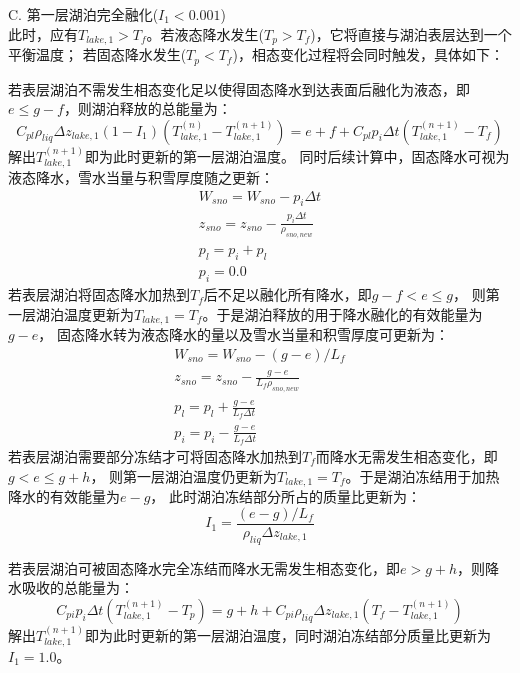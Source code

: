 C. 	第一层湖泊完全融化($I_1<0.001$)\\
此时，应有$T_{lake,1}>T_f$。若液态降水发生($T_p>T_f$)，它将直接与湖泊表层达到一个平衡温度；
若固态降水发生($T_p<T_f$)，相态变化过程将会同时触发，具体如下：

若表层湖泊不需发生相态变化足以使得固态降水到达表面后融化为液态，即$e\le g-f$，则湖泊释放的总能量为：
\begin{equation}
C_{p l} \rho_{liq} \Delta z_{lake, 1}\left(1-I_{1}\right)\left(T_{lake, 1}^{(n)}-T_{lake, 1}^{(n+1)}\right)=
e+f+C_{p l} p_{i} \Delta t\left(T_{lake, 1}^{(n+1)}-T_{f}\right)
\end{equation}
解出$T_{lake,1}^{\left(n+1\right)}$即为此时更新的第一层湖泊温度。
同时后续计算中，固态降水可视为液态降水，雪水当量与积雪厚度随之更新：
\begin{equation}
\begin{array}{c}
    W_{sno}=W_{sno}-p_{i} \Delta t \\ 
    z_{sno}=z_{sno}-\frac{p_{i} \Delta t}{\rho_{sno,new}} \\
    p_{l}=p_{i}+p_{l} \\ 
    p_{i}=0.0
\end{array}
\end{equation}
若表层湖泊将固态降水加热到$T_f$后不足以融化所有降水，即$g-f<e\le g$，
则第一层湖泊温度更新为$T_{lake,1}=T_f$。于是湖泊释放的用于降水融化的有效能量为$g-e$，
固态降水转为液态降水的量以及雪水当量和积雪厚度可更新为：
\begin{equation}
\begin{array}{c}
    W_{sno}=W_{sno}-(g-e) / L_{f} \\ 
    z_{sno}=z_{sno}-\frac{g-e}{L_{f} \rho_{sno,new}} \\
    p_{l}=p_{l}+\frac{g-e}{L_{f} \Delta t} \\ 
    p_{i}=p_{i}-\frac{g-e}{L_{f} \Delta t}
\end{array}
\end{equation}
若表层湖泊需要部分冻结才可将固态降水加热到$T_f$而降水无需发生相态变化，即$g<e\le g+h$，
则第一层湖泊温度仍更新为$T_{lake,1}=T_f$。于是湖泊冻结用于加热降水的有效能量为$e-g$，
此时湖泊冻结部分所占的质量比更新为：
\begin{equation}
I_{1}=\frac{(e-g) / L_{f}}{\rho_{liq} \Delta z_{lake, 1}}
\end{equation}

若表层湖泊可被固态降水完全冻结而降水无需发生相态变化，即$e>g+h$，则降水吸收的总能量为：
\begin{equation}
C_{p i} p_{i} \Delta t\left(T_{lake, 1}^{(n+1)}-T_{p}\right)=g+h+C_{p i} \rho_{liq} \Delta z_{lake, 1}
\left(T_{f}-T_{lake,1}^{(n+1)}\right)
\end{equation}
解出$T_{lake,1}^{\left(n+1\right)}$即为此时更新的第一层湖泊温度，同时湖泊冻结部分质量比更新为$I_1=1.0$。


